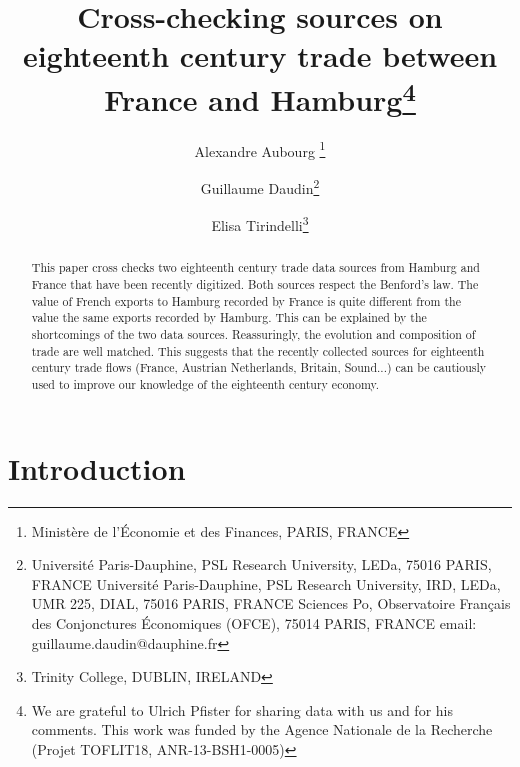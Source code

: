 \documentclass[12pt,a4paper,titlepage,english]{article}
\begin{document}
\title{Cross-checking sources on eighteenth century trade between France and Hamburg\thanks{We are grateful to Ulrich Pfister for sharing data with us and for his comments. This work was funded by the Agence Nationale de la Recherche (Projet TOFLIT18, ANR-13-BSH1-0005)}}
\author{Alexandre Aubourg \thanks{Ministère de l’Économie et des Finances, PARIS, FRANCE}
\and Guillaume Daudin\thanks{
Universit\'{e} Paris-Dauphine, PSL Research University, LEDa, 75016 PARIS, FRANCE \newline
Universit\'{e} Paris-Dauphine, PSL Research University, IRD, LEDa, UMR 225, DIAL, 75016 PARIS, FRANCE \newline
Sciences Po, Observatoire Fran\c{c}ais des Conjonctures \'{E}conomiques (OFCE), 75014 PARIS, FRANCE \newline
email: guillaume.daudin@dauphine.fr}
\and Elisa Tirindelli\thanks{Trinity College, DUBLIN, IRELAND}}




\maketitle

\begin{abstract}
This paper cross checks two eighteenth century trade data sources from Hamburg and France that have been recently digitized.
Both sources respect the Benford's law.
The value of French exports to Hamburg recorded by France is quite different from the value the same exports recorded by Hamburg.
This can be explained by the shortcomings of the two data sources.
Reassuringly, the evolution and composition of trade are well matched.
This suggests that the recently collected sources for eighteenth century trade flows (France, Austrian Netherlands, Britain, Sound...) can be cautiously used to improve our knowledge of the eighteenth century economy.  
\end{abstract}


\section{Introduction}
\end{document}
